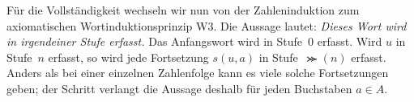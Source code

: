 Für die Vollständigkeit wechseln wir nun von der Zahleninduktion zum
axiomatischen Wortinduktionsprinzip W3. Die Aussage lautet:
\emph{Dieses Wort wird in irgendeiner
Stufe erfasst.} Das Anfangswort wird in Stufe~\(0\) erfasst. Wird
\(u\) in Stufe~\(n\) erfasst, so wird jede Fortsetzung \(s(u,a)\)
in Stufe~\(\Succ(n)\) erfasst. Anders als bei einer einzelnen
Zahlenfolge kann es viele solche Fortsetzungen geben; der Schritt
verlangt die Aussage deshalb für jeden Buchstaben \(a\in A\).

